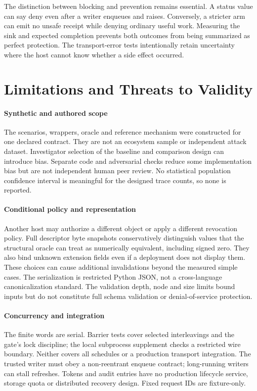 The distinction between blocking and prevention remains essential. A status value
can say deny even after a writer enqueues and raises. Conversely, a stricter arm
can emit no unsafe receipt while denying ordinary useful work. Measuring the sink
and expected completion prevents both outcomes from being summarized as perfect
protection. The transport-error tests intentionally retain uncertainty where the
host cannot know whether a side effect occurred.

\section{Limitations and Threats to Validity}
\paragraph{Synthetic and authored scope}
The scenarios, wrappers, oracle and reference mechanism were constructed for one
declared contract. They are not an ecosystem sample or independent attack dataset.
Investigator selection of the baseline and comparison design can introduce bias. Separate code and
adversarial checks reduce some implementation bias but are not independent human
peer review. No statistical population confidence interval is meaningful for the
designed trace counts, so none is reported.

\paragraph{Conditional policy and representation}
Another host may authorize a different object or apply a different revocation
policy. Full descriptor byte snapshots conservatively distinguish values that the
structural oracle can treat as numerically equivalent, including signed zero.
They also bind unknown extension fields even if a deployment does not display them.
These choices can cause additional invalidations beyond the measured simple cases.
The serialization is restricted Python JSON, not a cross-language canonicalization
standard. The validation depth, node and size limits bound inputs but do not
constitute full schema validation or denial-of-service protection.

\paragraph{Concurrency and integration}
The finite words are serial. Barrier tests cover selected interleavings and the
gate's lock discipline; the local subprocess supplement checks a restricted wire
boundary. Neither covers all schedules or a production transport integration.
The trusted writer must obey a non-reentrant enqueue contract; long-running writers
can stall refreshes. Tokens and audit entries have no production lifecycle service,
storage quota or distributed recovery design. Fixed request IDs are fixture-only.

